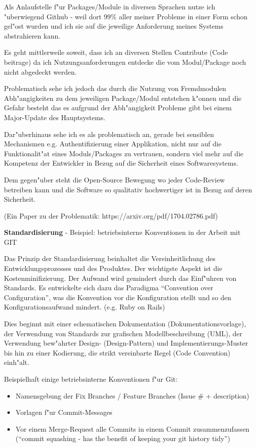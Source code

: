 Als Anlaufstelle f"ur Packages/Module in diversen Sprachen nutze ich "uberwiegend Github - weil dort 99\% aller meiner Probleme in einer Form schon gel"ost wurden und ich sie auf die jeweilige Anforderung meines Systems abstrahieren kann.

Es geht mittlerweile soweit, dass ich an diversen Stellen Contribute (Code beitrage) da ich Nutzungsanforderungen entdecke die vom Modul/Package noch nicht abgedeckt werden.

Problematisch sehe ich jedoch das durch die Nutzung von Fremdmodulen Abh"angigkeiten zu dem jeweiligen Package/Modul entstehen k"onnen und die Gefahr besteht das es aufgrund der Abh"angigkeit Probleme gibt bei einem Major-Update des Hauptsystems.

Dar"uberhinaus sehe ich es als problematisch an, gerade bei sensiblen Mechanismen e.g. Authentifizierung einer Applikation, nicht nur auf die Funktionalit"at eines Moduls/Packages zu vertrauen, sondern viel mehr auf die Kompetenz der Entwickler in Bezug auf die Sicherheit eines Softwaresystems.

Dem gegen"uber steht die Open-Source Bewegung wo jeder Code-Review betreiben kann und die Software so qualitativ hochwertiger ist in Bezug auf deren Sicherheit.

(Ein Paper zu der Problematik: https://arxiv.org/pdf/1704.02786.pdf)


\newpage
\textbf{Standardisierung}
- Beispiel: betriebsinterne Konventionen in der Arbeit mit GIT

Das Prinzip der Standardisierung beinhaltet die Vereinheitlichung des Entwicklungsprozesses und des Produktes. Der wichtigste Aspekt ist die Kostenminifizierung. Der Aufwand wird gemindert durch das Einf"uhren von Standards.
Es entwickelte sich dazu das Paradigma ``Convention over Configuration'', was die Konvention vor die Konfiguration stellt und so den Konfigurationsaufwand mindert. (e.g. Ruby on Rails)

Dies beginnt mit einer schematischen Dokumentation (Dokumentationsvorlage),
der Verwendung von Standards zur grafischen Modellbeschreibung (UML),
der Verwendung bew"ahrter Design- (Design-Pattern) und Implementierungs-Muster
bis hin zu einer Kodierung, die strikt vereinbarte Regel (Code Convention) einh"alt.

Beispielhaft einige betriebsinterne Konventionen f"ur Git:
\begin{itemize}
  \item Namensgebung der Fix Branches / Feature Branches (Issue \# + description)
  \item Vorlagen f"ur Commit-Messages
  \item Vor einem Merge-Request alle Commits in einem Commit zusammenzufassen  (``commit squashing - has the benefit of keeping your git history tidy'')

\end{itemize}


